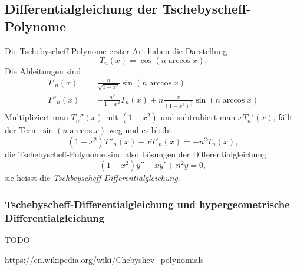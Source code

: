 \subsection{Differentialgleichung der Tschebyscheff-Polynome}
Die Tschebyscheff-Polynome erster Art haben die Darstellung
\[
T_n(x) = \cos(n\arccos x).
\]
Die Ableitungen sind
\begin{align*}
T'_n(x) &= \frac{n}{\sqrt{1-x^2}} \sin(n\arccos x)
\\
T''_n(x) &= 
-\frac{n^2}{1-x^2} T_n(x)
+
n\frac{x}{(1-x^2)^{\frac32}} \sin(n\arccos x)
\end{align*}
Multipliziert man $T_n''(x)$  mit $(1-x^2)$ und subtrahiert
man $xT_n'(x)$, fällt der Term $\sin(n\arccos x)$ weg und es bleibt
\begin{equation}
(1-x^2)T''_n(x) -xT'_n(x) = -n^2 T_n(x),
\label{buch:differential:tschebyscheff:Tdgl}
\end{equation}
die Tschebyscheff-Polynome sind also Lösungen der Differentialgleichung
\begin{equation}
(1-x^2)y'' -xy' +n^2 y=0,
\label{buch:differential:tschebyscheff:Tdgl}
\end{equation}
sie heisst die {\em Tschbeyscheff-Differentialgleichung}.

\subsubsection{Tschebyscheff-Differentialgleichung und hypergeometrische Differentialgleichung}
TODO

\url{https://en.wikipedia.org/wiki/Chebyshev_polynomials}
